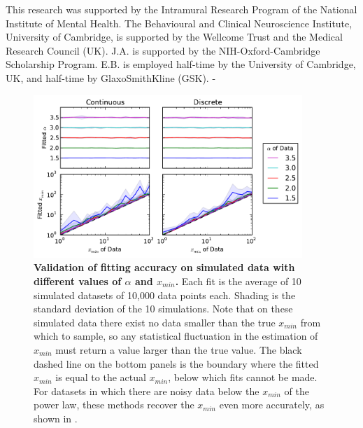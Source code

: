 \documentclass[10pt]{article}
\begin{document}
This research was supported by the Intramural Research Program of the National Institute of Mental Health. The Behavioural and Clinical Neuroscience Institute, University of Cambridge, is supported by the Wellcome Trust and the Medical Research Council (UK). J.A. is supported by the NIH-Oxford-Cambridge Scholarship Program. E.B. is employed half-time by the University of Cambridge, UK, and half-time by GlaxoSmithKline (GSK).
-
 
 
 \setcounter{figure}{0}
 \renewcommand{\thefigure}{S\arabic{figure}}
 
 \begin{figure}[!ht]
 \begin{center}
\includegraphics[width=4in]{Fig_powerlaw_validation.pdf}
 \end{center}
 \caption{
 {\bf Validation of fitting accuracy on simulated data with different values of $\alpha$ and $x_{min}$.} Each fit is the average of 10 simulated datasets of 10,000 data points each. Shading is the standard deviation of the 10 simulations. Note that on these simulated data there exist no data smaller than the true $x_{min}$ from which to sample, so any statistical fluctuation in the estimation of $x_{min}$ must return a value larger than the true value. The black dashed line on the bottom panels is the boundary where the fitted $x_{min}$ is equal to the actual $x_{min}$, below which fits cannot be made. For datasets in which there are noisy data below the $x_{min}$ of the power law, these methods recover the $x_{min}$ even more accurately, as shown in \cite{Clauset2009}.
 }
 \label{powerlaw_validation}
 \end{figure}
 
\setcounter{figure}{0}
\renewcommand{\figurename}{Code}
\end{document}
